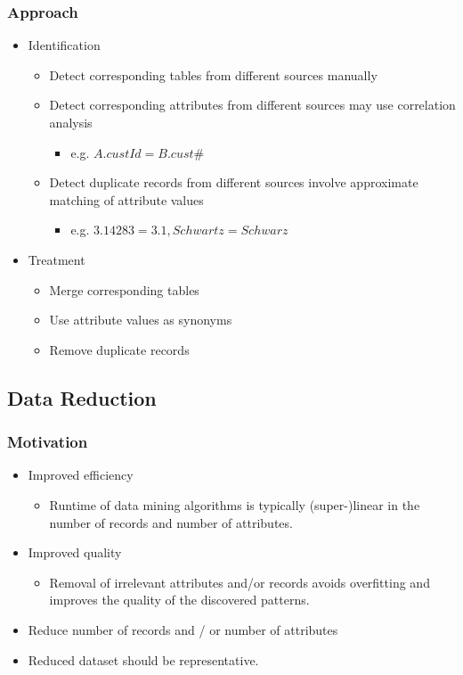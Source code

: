 \documentclass[../notes.tex]{subfiles}
\begin{document}
\subsubsection{Approach}
\begin{itemize}
  \item Identification
  \begin{itemize}
    \item Detect corresponding tables from different sources manually
    \item Detect corresponding attributes from different sources may use correlation analysis
    \begin{itemize}
      \item e.g. $A.custId = B.cust\#$
    \end{itemize}

    \item Detect duplicate records from different sources involve approximate matching of attribute values
    \begin{itemize}
      \item e.g. $3.14283 = 3.1, Schwartz = Schwarz$
    \end{itemize}

  \end{itemize}

  \item Treatment
  \begin{itemize}
    \item Merge corresponding tables
    \item Use attribute values as synonyms
    \item Remove duplicate records
  \end{itemize}
\end{itemize}

\subsection{Data Reduction}
\subsubsection{Motivation}
\begin{itemize}
  \item Improved efficiency
  \begin{itemize}
    \item Runtime of data mining algorithms is typically (super-)linear in the number of records and number of attributes.
  \end{itemize}  

  \item Improved quality
  \begin{itemize}
    \item Removal of irrelevant attributes and/or records avoids overfitting and improves the quality of the discovered patterns.
  \end{itemize}  

  \item Reduce number of records and / or number of attributes
  \item Reduced dataset should be representative.
\end{itemize}
\end{document}
